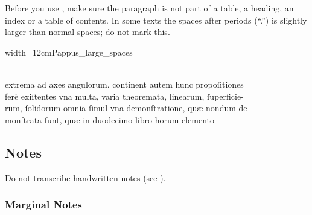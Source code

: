 \begin{clarification}
Before you use , make sure the paragraph is not part of a table, a heading, an index or a table of contents. In some texts the spaces after periods (“.”) is slightly larger than normal spaces; do not mark this.
\end{clarification}

\begin{sampleImageSmall}[ 2]{width=12cm}{Pappus_large_spaces}

\begin{typeLatin}
 \someText \\
extrema ad axes  angulorum. continent autem hunc propoſitiones  \\
ferè exiſtentes vna multa,  varia theoremata,  linearum, \lwr ſuperficie-  \\
rum,  ſolidorum omnia ſimul vna demonſtratione,  quæ nondum de-  \\
monſtrata ſunt,  quæ   in duodecimo libro horum elemento-  \\
\someText {}
\end{typeLatin}
\end{sampleImageSmall}


\tocspace
\subsection{Notes}

\begin{note}
Do not transcribe handwritten notes (see ).
\end{note}

\subsubsection{Marginal Notes}
\label{section marginal notes}

